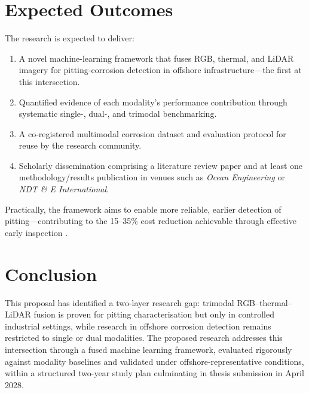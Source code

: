\documentclass[conference]{IEEEtran}
\begin{document}
\section{Expected Outcomes}

The research is expected to deliver:
\begin{enumerate}
    \item A novel machine-learning framework that fuses RGB, thermal, and LiDAR imagery for pitting-corrosion detection in offshore infrastructure—the first at this intersection.
    \item Quantified evidence of each modality's performance contribution through systematic single-, dual-, and trimodal benchmarking.
    \item A co-registered multimodal corrosion dataset and evaluation protocol for reuse by the research community.
    \item Scholarly dissemination comprising a literature review paper and at least one methodology/results publication in venues such as \textit{Ocean Engineering} or \textit{NDT \& E International}.
\end{enumerate}
Practically, the framework aims to enable more reliable, earlier detection of pitting—contributing to the 15--35\% cost reduction achievable through effective early inspection \cite{olawole2026advanced}.


\section{Conclusion}

This proposal has identified a two-layer research gap: trimodal RGB--thermal--LiDAR fusion is proven for pitting characterisation but only in controlled industrial settings, while research in offshore corrosion detection remains restricted to single or dual modalities. The proposed research addresses this intersection through a fused machine learning framework, evaluated rigorously against modality baselines and validated under offshore-representative conditions, within a structured two-year study plan culminating in thesis submission in April 2028.



\end{document}
